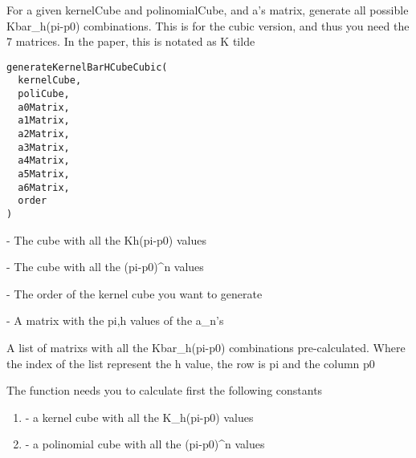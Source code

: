 \documentclass[letterpaper]{book}
\begin{document}
%
\begin{Description}\relax
For a given kernelCube and polinomialCube, and a's matrix, generate all possible Kbar\_h(pi-p0) combinations.
This is for the cubic version, and thus you need the 7 matrices. In the paper, this is notated as K tilde
\end{Description}
%
\begin{Usage}
\begin{verbatim}
generateKernelBarHCubeCubic(
  kernelCube,
  poliCube,
  a0Matrix,
  a1Matrix,
  a2Matrix,
  a3Matrix,
  a4Matrix,
  a5Matrix,
  a6Matrix,
  order
)
\end{verbatim}
\end{Usage}
%
\begin{Arguments}
\begin{ldescription}
\item[\code{kernelCube}] - The cube with all the Kh(pi-p0) values

\item[\code{poliCube}] - The cube with all the (pi-p0)\textasciicircum{}n values

\item[\code{order}] - The order of the kernel cube you want to generate

\item[\code{anMatrix}] - A matrix with the pi,h values of the a\_n's
\end{ldescription}
\end{Arguments}
%
\begin{Value}
A list of matrixs with all the Kbar\_h(pi-p0) combinations pre-calculated.
Where the index of the list represent the h value, the row is pi and the column p0
\end{Value}
%
\begin{Note}\relax
The function needs you to calculate first the following constants

\begin{enumerate}

\item{} - a kernel cube with all the K\_h(pi-p0) values
\item{} - a polinomial cube with all the (pi-p0)\textasciicircum{}n values

\end{enumerate}

\end{Note}
\end{document}
